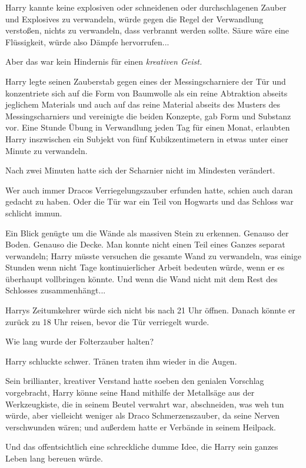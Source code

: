 {Harry kannte keine explosiven oder schneidenen oder durchschlagenen Zauber und Explosives zu verwandeln, würde gegen die Regel der Verwandlung verstoßen, nichts zu verwandeln, dass verbrannt werden sollte. Säure wäre eine Flüssigkeit, würde also Dämpfe hervorrufen...

Aber das war kein Hindernis für einen \emph{kreativen Geist.}

Harry legte seinen Zauberstab gegen eines der Messingscharniere der Tür und konzentriete sich auf die Form von Baumwolle als ein reine Abtraktion abseits jeglichem Materials und auch auf das reine Material abseits des Musters des Messingscharniers und vereinigte die beiden Konzepte, gab Form und Substanz vor. Eine Stunde Übung in Verwandlung jeden Tag für einen Monat, erlaubten Harry inszwischen ein Subjekt von fünf Kubikzentimetern in etwas unter einer Minute zu verwandeln.

Nach zwei Minuten hatte sich der Scharnier nicht im Mindesten verändert.

Wer auch immer Dracos Verriegelungszauber erfunden hatte, schien auch daran gedacht zu haben. Oder die Tür war ein Teil von Hogwarts und das Schloss war schlicht immun.

Ein Blick genügte um die Wände als massiven Stein zu erkennen. Genauso der Boden. Genauso die Decke. Man konnte nicht einen Teil eines Ganzes separat verwandeln; Harry müsste versuchen die gesamte Wand zu verwandeln, was einige Stunden wenn nicht Tage kontinuierlicher Arbeit bedeuten würde, wenn er es überhaupt vollbringen könnte. Und wenn die Wand nicht mit dem Rest des Schlosses zusammenhängt...

Harrys Zeitumkehrer würde sich nicht bis nach 21 Uhr öffnen. Danach könnte er zurück zu 18 Uhr reisen, bevor die Tür verriegelt wurde.

Wie lang wurde der Folterzauber halten?

Harry schluckte schwer. Tränen traten ihm wieder in die Augen.

Sein brillianter, kreativer Verstand hatte soeben den genialen Vorschlag vorgebracht, Harry könne seine Hand mithilfe der Metallsäge aus der Werkzeugkiste, die in seinem Beutel verwahrt war, abschneiden, was weh tun würde, aber vielleicht weniger als Draco Schmerzenszauber, da seine Nerven verschwunden wären; und außerdem hatte er Verbände in seinem Heilpack.

Und das offentsichtlich eine schreckliche dumme Idee, die Harry sein ganzes Leben lang bereuen würde.

}
